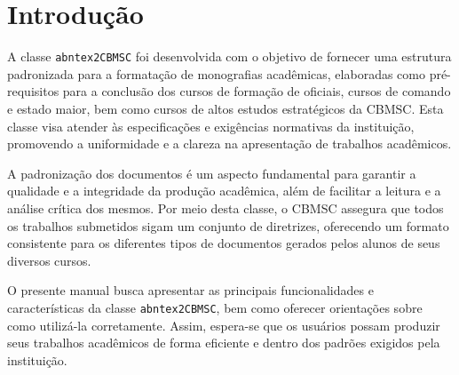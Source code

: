 \chapter{Introdução}

A classe \texttt{abntex2CBMSC} foi desenvolvida com o objetivo de fornecer uma estrutura padronizada para a formatação de monografias acadêmicas, elaboradas como pré-requisitos para a conclusão dos cursos de formação de oficiais, cursos de comando e estado maior, bem como cursos de altos estudos estratégicos da \acrfull{CBMSC}. Esta classe visa atender às especificações e exigências normativas da instituição, promovendo a uniformidade e a clareza na apresentação de trabalhos acadêmicos.

A padronização dos documentos é um aspecto fundamental para garantir a qualidade e a integridade da produção acadêmica, além de facilitar a leitura e a análise crítica dos mesmos. Por meio desta classe, o \acrshort{CBMSC} assegura que todos os trabalhos submetidos sigam um conjunto de diretrizes, oferecendo um formato consistente para os diferentes tipos de documentos gerados pelos alunos de seus diversos cursos.

O presente manual busca apresentar as principais funcionalidades e características da classe \texttt{abntex2CBMSC}, bem como oferecer orientações sobre como utilizá-la corretamente. Assim, espera-se que os usuários possam produzir seus trabalhos acadêmicos de forma eficiente e dentro dos padrões exigidos pela instituição.
